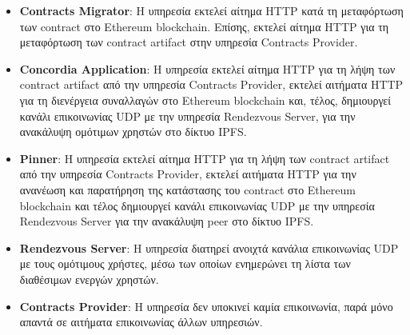 \begin{itemize}
    \item \textbf{Contracts Migrator}: Η υπηρεσία εκτελεί αίτημα HTTP κατά τη μεταφόρτωση των \textenglish{contract} στο Ethereum blockchain. Επίσης, εκτελεί αίτημα HTTP για τη μεταφόρτωση των \textenglish{contract artifact} στην υπηρεσία Contracts Provider.

    \item \textbf{Concordia Application}: Η υπηρεσία εκτελεί αίτημα HTTP για τη λήψη των \textenglish{contract artifact} από την υπηρεσία Contracts Provider, εκτελεί αιτήματα HTTP για τη διενέργεια συναλλαγών στο Ethereum blockchain και, τέλος, δημιουργεί κανάλι επικοινωνίας UDP με την υπηρεσία Rendezvous Server, για την ανακάλυψη ομότιμων χρηστών στο δίκτυο IPFS.

    \item \textbf{Pinner}: Η υπηρεσία εκτελεί αίτημα HTTP για τη λήψη των \textenglish{contract artifact} από την υπηρεσία Contracts Provider, εκτελεί αιτήματα HTTP για την ανανέωση και παρατήρηση της κατάστασης του contract στο Ethereum blockchain και τέλος δημιουργεί κανάλι επικοινωνίας UDP με την υπηρεσία Rendezvous Server για την ανακάλυψη peer στο δίκτυο IPFS.

    \item \textbf{Rendezvous Server}: Η υπηρεσία διατηρεί ανοιχτά κανάλια επικοινωνίας UDP με τους ομότιμους χρήστες, μέσω των οποίων ενημερώνει τη λίστα των διαθέσιμων ενεργών χρηστών.

    \item \textbf{Contracts Provider}: Η υπηρεσία δεν υποκινεί καμία επικοινωνία, παρά μόνο απαντά σε αιτήματα επικοινωνίας άλλων υπηρεσιών.
\end{itemize}